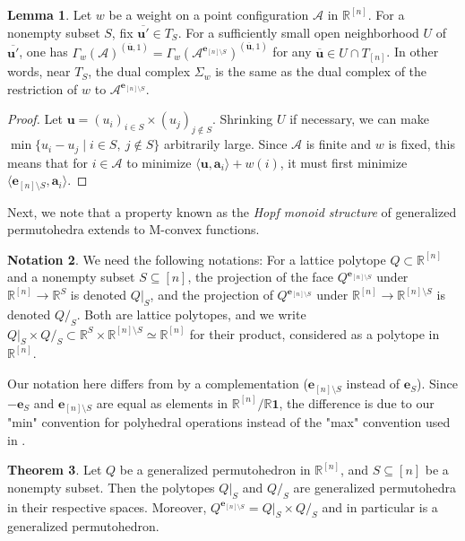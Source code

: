 \documentclass[11pt]{amsart}
\newcommand{\RR}{\mathbb R}
\newcommand{\be}{\mathbf e}
\newcommand{\bu}{{\mathbf u}}
\theoremstyle{definition}
\newtheorem{thm}{Theorem}[subsection]
\newtheorem{lem}[thm]{Lemma}
\newtheorem{notation}[thm]{Notation}
\begin{document}
\begin{lem}\label{lem:boundaryface}
Let $w$ be a weight on a point configuration $\mathcal A$ in $\RR^{[n]}$.  For a nonempty subset $S$, fix $\overline{\bu'}\in T_S$.  For a sufficiently small open neighborhood $U$ of $\overline{\bu'}$, one has $\Gamma_w(\mathcal A)^{(\overline \bu,1)} = \Gamma_{w}(\mathcal A^{\be_{[n]\setminus S}})^{(\overline \bu,1)}$ for any $\overline{\bu}\in U\cap T_{[n]}$. In other words, near $T_S$, the dual complex $\Sigma_w$ is the same as the dual complex of the restriction of $w$ to $\mathcal A^{\be_{[n]\setminus S}}$.
\end{lem}

\begin{proof}
Let $\bu = (u_i)_{i\in S} \times (u_j)_{j\notin S}$.  Shrinking $U$ if necessary, we can make $\min\{u_i - u_j \mid i\in S,\ j\notin S\}$ arbitrarily large.  Since $\mathcal A$ is finite and $w$ is fixed, this means that for $i\in \mathcal A$
to minimize $\langle {\bu}, \mathbf a_i \rangle +w(i)$, it must first minimize $\langle \be_{[n]\setminus S}, \mathbf a_i\rangle$.
\end{proof}

Next, we note that a property known as the \emph{Hopf monoid structure} of generalized permutohedra extends to M-convex functions.

\begin{notation}
 We need the following notations:  For a lattice polytope $Q\subset \RR^{[n]}$ and a nonempty subset $S\subseteq [n]$, the projection of the face $Q^{\be_{[n]\setminus S}}$ under $\RR^{[n]} \to \RR^S$ is denoted $Q|_S$, and the projection of $Q^{\be_{[n]\setminus S}}$ under $\RR^{[n]} \to \RR^{[n]\setminus S}$ is denoted $Q/_S$.  Both are lattice polytopes, and we write $Q|_S \times Q/_S \subset \RR^S \times \RR^{[n]\setminus S} \simeq \RR^{[n]}$ for their product, considered as a polytope in $\RR^{[n]}$.
 
 Our notation here differs from \cite{AA17} by a complementation ($\be_{[n]\setminus S}$ instead of $\be_S$).  Since $-\be_S$ and $\be_{[n]\setminus S}$ are equal as elements in $\RR^{[n]}/\RR\mathbf 1$, the difference is due to our "min" convention for polyhedral operations instead of the "max" convention used in \cite{AA17}.
\end{notation}


\begin{thm}\label{thm:AA17}\cite[Theorem 6.1]{AA17} Let $Q$ be a generalized permutohedron in $\RR^{[n]}$, and $S\subseteq [n]$ be a nonempty subset.  Then the polytopes $Q|_S$ and $Q/_S$ are generalized permutohedra in their respective spaces.  Moreover, %
$Q^{\be_{[n]\setminus S}} = Q|_S \times Q/_S$ and in particular is a generalized permutohedron.
\end{thm}
\end{document}
